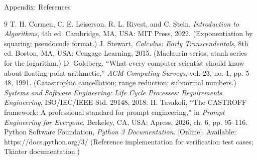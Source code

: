 \documentclass[11pt]{beamer}
\newcommand{\backupend}{\setcounter{framenumber}{\value{finalframe}}}
\begin{document}
\begin{frame}{Appendix: References}
  \footnotesize
  \begin{thebibliography}{9}
     T. H. Cormen, C. E. Leiserson, R. L. Rivest, and
      C. Stein, \emph{Introduction to Algorithms}, 4th ed. Cambridge, MA,
      USA: MIT Press, 2022. (Exponentiation by squaring; pseudocode format.)
     J. Stewart, \emph{Calculus: Early Transcendentals},
      8th ed. Boston, MA, USA: Cengage Learning, 2015. (Maclaurin series;
      atanh series for the logarithm.)
     D. Goldberg, ``What every computer scientist should
      know about floating-point arithmetic,'' \emph{ACM Computing Surveys},
      vol. 23, no. 1, pp. 5--48, 1991. (Catastrophic cancellation; range
      reduction; subnormal numbers.)
     \emph{Systems and Software Engineering: Life Cycle
      Processes: Requirements Engineering}, ISO/IEC/IEEE Std. 29148, 2018.
     H. Tavakoli, ``The CASTROFF framework: A professional
      standard for prompt engineering,'' in \emph{Prompt Engineering for
      Everyone}. Berkeley, CA, USA: Apress, 2026, ch. 6, pp. 95--116.
     Python Software Foundation, \emph{Python 3
      Documentation}. [Online]. Available: https://docs.python.org/3/
      (Reference implementation for verification test cases;
      Tkinter documentation.)
  \end{thebibliography}
\end{frame}

\backupend
\end{document}
